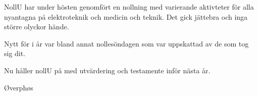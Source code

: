 \documentclass[../_main/handlingar.tex]{subfiles}
\begin{document}
NollU har under hösten genomfört en nollning med varierande aktivteter för alla nyantagna på elektroteknik och medicin och teknik. Det gick jättebra och inga större olyckor hände.

Nytt för i år var bland annat nollesöndagen som var uppskattad av de som tog sig dit.

Nu håller nollU på med utvärdering och testamente inför nästa år.

\begin{signatures}{1}
    \mvh
    \signature{Niklas Gustafson}{Øverphøs}
\end{signatures}
\end{document}
